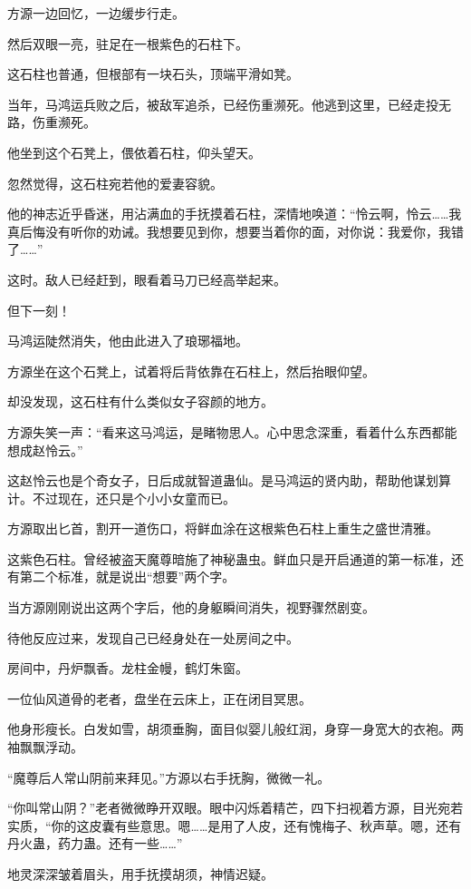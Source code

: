 \begin{this_body}
方源一边回忆，一边缓步行走。

然后双眼一亮，驻足在一根紫色的石柱下。

这石柱也普通，但根部有一块石头，顶端平滑如凳。

当年，马鸿运兵败之后，被敌军追杀，已经伤重濒死。他逃到这里，已经走投无路，伤重濒死。

他坐到这个石凳上，偎依着石柱，仰头望天。

忽然觉得，这石柱宛若他的爱妻容貌。

他的神志近乎昏迷，用沾满血的手抚摸着石柱，深情地唤道：“怜云啊，怜云……我真后悔没有听你的劝诫。我想要见到你，想要当着你的面，对你说：我爱你，我错了……”

这时。敌人已经赶到，眼看着马刀已经高举起来。

但下一刻！

马鸿运陡然消失，他由此进入了琅琊福地。

方源坐在这个石凳上，试着将后背依靠在石柱上，然后抬眼仰望。

却没发现，这石柱有什么类似女子容颜的地方。

方源失笑一声：“看来这马鸿运，是睹物思人。心中思念深重，看着什么东西都能想成赵怜云。”

这赵怜云也是个奇女子，日后成就智道蛊仙。是马鸿运的贤内助，帮助他谋划算计。不过现在，还只是个小小女童而已。

方源取出匕首，割开一道伤口，将鲜血涂在这根紫色石柱上重生之盛世清雅。

这紫色石柱。曾经被盗天魔尊暗施了神秘蛊虫。鲜血只是开启通道的第一标准，还有第二个标准，就是说出“想要”两个字。

当方源刚刚说出这两个字后，他的身躯瞬间消失，视野骤然剧变。

待他反应过来，发现自己已经身处在一处房间之中。

房间中，丹炉飘香。龙柱金幔，鹤灯朱窗。

一位仙风道骨的老者，盘坐在云床上，正在闭目冥思。

他身形瘦长。白发如雪，胡须垂胸，面目似婴儿般红润，身穿一身宽大的衣袍。两袖飘飘浮动。

“魔尊后人常山阴前来拜见。”方源以右手抚胸，微微一礼。

“你叫常山阴？”老者微微睁开双眼。眼中闪烁着精芒，四下扫视着方源，目光宛若实质，“你的这皮囊有些意思。嗯……是用了人皮，还有愧梅子、秋声草。嗯，还有丹火蛊，药力蛊。还有一些……”

地灵深深皱着眉头，用手抚摸胡须，神情迟疑。


\end{this_body}
